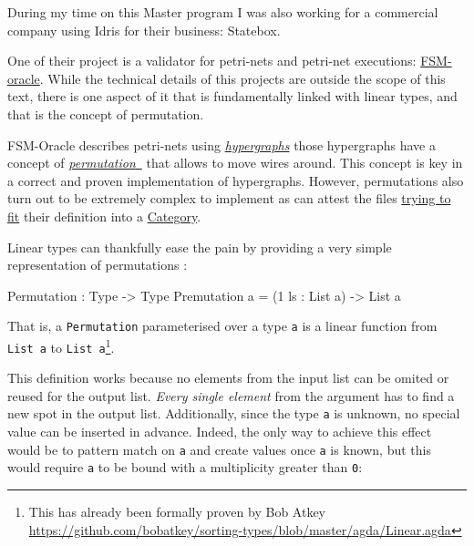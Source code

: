 \documentclass[
]{article}
\newenvironment{Shaded}{}{}
\newcommand{\DataTypeTok}[1]{\textcolor[rgb]{0.56,0.13,0.00}{#1}}
\newcommand{\DecValTok}[1]{\textcolor[rgb]{0.25,0.63,0.44}{#1}}
\newcommand{\NormalTok}[1]{#1}
\newcommand{\OperatorTok}[1]{\textcolor[rgb]{0.40,0.40,0.40}{#1}}
\newcommand{\OtherTok}[1]{\textcolor[rgb]{0.00,0.44,0.13}{#1}}
\begin{document}
During my time on this Master program I was also working for a
commercial company using Idris for their business: Statebox.

One of their project is a validator for petri-nets\cite{petri-nets} and
petri-net executions:
\href{https://github.com/statebox/fsm-oracle}{FSM-oracle}. While the
technical details of this projects are outside the scope of this text,
there is one aspect of it that is fundamentally linked with linear
types, and that is the concept of permutation.

FSM-Oracle describes petri-nets using
\href{http://www.zanasi.com/fabio/files/paperCALCO19b.pdf}{\emph{hypergraphs}}
\cite{cartographer} those hypergraphs have a concept of
\href{https://github.com/statebox/fsm-oracle/blob/master/src/Permutations/Permutations.idr\#L31}{\emph{permutation}~}
that allows to move wires around. This concept is key in a correct and
proven implementation of hypergraphs. However, permutations also turn
out to be extremely complex to implement as can attest the files
\href{https://github.com/statebox/fsm-oracle/blob/master/src/Permutations/PermutationsCategory.idr}{trying
to fit} their definition into a
\href{https://github.com/statebox/fsm-oracle/blob/master/src/Permutations/PermutationsStrictMonoidalCategory.idr}{Category}.

Linear types can thankfully ease the pain by providing a very simple
representation of permutations :

\begin{Shaded}
\begin{Highlighting}[]
\DataTypeTok{Permutation} \OperatorTok{:} \DataTypeTok{Type} \OtherTok{{-}\textgreater{}} \DataTypeTok{Type}
\DataTypeTok{Premutation}\NormalTok{ a }\OtherTok{=}\NormalTok{ (}\DecValTok{1}\NormalTok{ ls }\OperatorTok{:} \DataTypeTok{List}\NormalTok{ a) }\OtherTok{{-}\textgreater{}} \DataTypeTok{List}\NormalTok{ a}
\end{Highlighting}
\end{Shaded}

That is, a \texttt{Permutation} parameterised over a type \texttt{a} is
a linear function from \texttt{List\ a} to \texttt{List\ a}\footnote{This
  has already been formally proven by Bob Atkey
  \url{https://github.com/bobatkey/sorting-types/blob/master/agda/Linear.agda}}.

This definition works because no elements from the input list can be
omited or reused for the output list. \emph{Every single element} from
the argument has to find a new spot in the output list. Additionally,
since the type \texttt{a} is unknown, no special value can be inserted
in advance. Indeed, the only way to achieve this effect would be to
pattern match on \texttt{a} and create values once \texttt{a} is known,
but this would require \texttt{a} to be bound with a multiplicity
greater than \texttt{0}:
\end{document}
